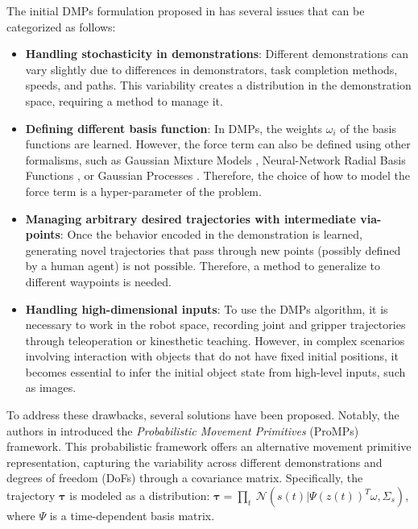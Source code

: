 The initial DMPs formulation proposed in \cite{ijspeert2002learning} has several issues that can be categorized as follows:
\begin{itemize}
    \item \textbf{Handling stochasticity in demonstrations}: Different demonstrations can vary slightly due to differences in demonstrators, task completion methods, speeds, and paths. This variability creates a distribution in the demonstration space, requiring a method to manage it.
    
    \item \textbf{Defining different basis function}: In DMPs, the weights $\omega_{i}$ of the basis functions are learned. However, the force term can also be defined using other formalisms, such as Gaussian Mixture Models \cite{si2023composite}, Neural-Network Radial Basis Functions \cite{li2023human}, or Gaussian Processes \cite{fanger2016gaussian}. Therefore, the choice of how to model the force term is a hyper-parameter of the problem.

    \item \textbf{Managing arbitrary desired trajectories with intermediate via-points}: Once the behavior encoded in the demonstration is learned, generating novel trajectories that pass through new points (possibly defined by a human agent) is not possible. Therefore, a method to generalize to different waypoints is needed.
    
    \item \textbf{Handling high-dimensional inputs}: To use the DMPs algorithm, it is necessary to work in the robot space, recording joint and gripper trajectories through teleoperation or kinesthetic teaching. However, in complex scenarios involving interaction with objects that do not have fixed initial positions, it becomes essential to infer the initial object state from high-level inputs, such as images.
\end{itemize}
To address these drawbacks, several solutions have been proposed. Notably, the authors in \cite{paraschos2013ProMPs} introduced the \textit{Probabilistic Movement Primitives} (ProMPs) framework. This probabilistic framework offers an alternative movement primitive representation, capturing the variability across different demonstrations and degrees of freedom (DoFs) through a covariance matrix. Specifically, the trajectory $\mathbf{\tau}$ is modeled as a distribution: $\boldsymbol{\tau} = \underset{t}{\prod} \ \mathcal{N}(s(t)|\Psi(z(t))^{T}\omega, \Sigma_{s})$, where $\Psi$ is a time-dependent basis matrix.

